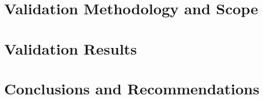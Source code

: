 \documentclass[letterpaper,11pt, oneside]{layout}
\begin{document}

\begingroup
\renewcommand{\clearpage}{}
\chapter{Validation Methodology and Scope}
\label{chap:vms}
\endgroup


\begingroup
\renewcommand{\clearpage}{}
\chapter{Validation Results}
\label{chap:vr}
\endgroup


\begingroup
\renewcommand{\clearpage}{}
\chapter{Conclusions and Recommendations}
\label{chap:cr}
\endgroup


\appendix
\renewcommand\theequation{\Alph{chapter}--\arabic{equation}}
\renewcommand\thefigure{\Alph{chapter}--\arabic{figure}}
\renewcommand\thetable{\Alph{chapter}--\arabic{table}}

%
%


\backmatter



\end{document}
